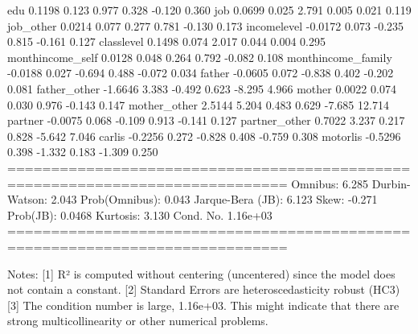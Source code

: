 edu                    0.1198      0.123      0.977      0.328      -0.120       0.360
job                    0.0699      0.025      2.791      0.005       0.021       0.119
job_other              0.0214      0.077      0.277      0.781      -0.130       0.173
incomelevel           -0.0172      0.073     -0.235      0.815      -0.161       0.127
classlevel             0.1498      0.074      2.017      0.044       0.004       0.295
monthincome_self       0.0128      0.048      0.264      0.792      -0.082       0.108
monthincome_family    -0.0188      0.027     -0.694      0.488      -0.072       0.034
father                -0.0605      0.072     -0.838      0.402      -0.202       0.081
father_other          -1.6646      3.383     -0.492      0.623      -8.295       4.966
mother                 0.0022      0.074      0.030      0.976      -0.143       0.147
mother_other           2.5144      5.204      0.483      0.629      -7.685      12.714
partner               -0.0075      0.068     -0.109      0.913      -0.141       0.127
partner_other          0.7022      3.237      0.217      0.828      -5.642       7.046
carlis                -0.2256      0.272     -0.828      0.408      -0.759       0.308
motorlis              -0.5296      0.398     -1.332      0.183      -1.309       0.250
==============================================================================
Omnibus:                        6.285   Durbin-Watson:                   2.043
Prob(Omnibus):                  0.043   Jarque-Bera (JB):                6.123
Skew:                          -0.271   Prob(JB):                       0.0468
Kurtosis:                       3.130   Cond. No.                     1.16e+03
==============================================================================

Notes:
[1] R² is computed without centering (uncentered) since the model does not contain a constant.
[2] Standard Errors are heteroscedasticity robust (HC3)
[3] The condition number is large, 1.16e+03. This might indicate that there are
strong multicollinearity or other numerical problems.